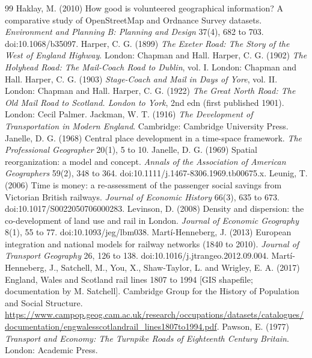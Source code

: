 \documentclass[11pt,a4paper]{article}
\begin{document}
\begin{thebibliography}{99}
 Haklay, M. (2010) How good is volunteered geographical information? A comparative study of OpenStreetMap and Ordnance Survey datasets. \textit{Environment and Planning B: Planning and Design} 37(4), 682 to 703. doi:10.1068/b35097.
 Harper, C. G. (1899) \textit{The Exeter Road: The Story of the West of England Highway}. London: Chapman and Hall.
 Harper, C. G. (1902) \textit{The Holyhead Road: The Mail-Coach Road to Dublin}, vol. I. London: Chapman and Hall.
 Harper, C. G. (1903) \textit{Stage-Coach and Mail in Days of Yore}, vol. II. London: Chapman and Hall.
 Harper, C. G. (1922) \textit{The Great North Road: The Old Mail Road to Scotland. London to York}, 2nd edn (first published 1901). London: Cecil Palmer.
 Jackman, W. T. (1916) \textit{The Development of Transportation in Modern England}. Cambridge: Cambridge University Press.
 Janelle, D. G. (1968) Central place development in a time-space framework. \textit{The Professional Geographer} 20(1), 5 to 10.
 Janelle, D. G. (1969) Spatial reorganization: a model and concept. \textit{Annals of the Association of American Geographers} 59(2), 348 to 364. doi:10.1111/j.1467-8306.1969.tb00675.x.
 Leunig, T. (2006) Time is money: a re-assessment of the passenger social savings from Victorian British railways. \textit{Journal of Economic History} 66(3), 635 to 673. doi:10.1017/S0022050706000283.
 Levinson, D. (2008) Density and dispersion: the co-development of land use and rail in London. \textit{Journal of Economic Geography} 8(1), 55 to 77. doi:10.1093/jeg/lbm038.
 Mart\'i-Henneberg, J. (2013) European integration and national models for railway networks (1840 to 2010). \textit{Journal of Transport Geography} 26, 126 to 138. doi:10.1016/j.jtrangeo.2012.09.004.
 Mart\'i-Henneberg, J., Satchell, M., You, X., Shaw-Taylor, L. and Wrigley, E. A. (2017) England, Wales and Scotland rail lines 1807 to 1994 [GIS shapefile; documentation by M. Satchell]. Cambridge Group for the History of Population and Social Structure. \url{https://www.campop.geog.cam.ac.uk/research/occupations/datasets/catalogues/documentation/engwalesscotlandrail_lines1807to1994.pdf}.
 Pawson, E. (1977) \textit{Transport and Economy: The Turnpike Roads of Eighteenth Century Britain}. London: Academic Press.

\end{thebibliography}
\end{document}

